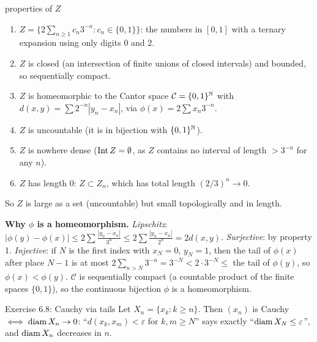 \begin{center}
\end{center}

\begin{thm}{properties of $Z$}
\begin{enumerate}
\item $Z=\{2\sum_{n\ge1}c_n3^{-n}:c_n\in\{0,1\}\}$: the numbers in $[0,1]$ with a ternary
  expansion using only digits $0$ and $2$.
\item $Z$ is closed (an intersection of finite unions of closed intervals) and bounded, so
  sequentially compact.
\item $Z$ is homeomorphic to the Cantor space $\mathcal C=\{0,1\}^\mathbb N$ with
  $d(x,y)=\sum2^{-n}|y_n-x_n|$, via $\phi(x)=2\sum x_n3^{-n}$.
\item $Z$ is uncountable (it is in bijection with $\{0,1\}^\mathbb N$).
\item $Z$ is nowhere dense ($\operatorname{Int} Z=\emptyset$, as $Z$ contains no interval of length
  $>3^{-n}$ for any $n$).
\item $Z$ has length $0$: $Z\subset Z_n$, which has total length $(2/3)^n\to0$.
\end{enumerate}
So $Z$ is large as a set (uncountable) but small topologically and in length.
\end{thm}
\begin{answer}
\textbf{Why $\phi$ is a homeomorphism.} \emph{Lipschitz}: $|\phi(y)-\phi(x)|\le2\sum
\frac{|y_n-x_n|}{3^n}\le2\sum\frac{|y_n-x_n|}{2^n}=2d(x,y)$. \emph{Surjective}: by property 1.
\emph{Injective}: if $N$ is the first index with $x_N=0$, $y_N=1$, then the tail of $\phi(x)$
after place $N-1$ is at most $2\sum_{n>N}3^{-n}=3^{-N}<2\cdot3^{-N}\le$ the tail of $\phi(y)$,
so $\phi(x)<\phi(y)$. $\mathcal C$ is sequentially compact (a countable product of the finite
spaces $\{0,1\}$), so the continuous bijection $\phi$ is a homeomorphism.
\end{answer}

\begin{example}{Exercise 6.8: Cauchy via tails}
Let $X_n=\{x_k:k\ge n\}$. Then $(x_n)$ is Cauchy $\iff\operatorname{diam} X_n\to0$: ``$d(x_k,x_m)<\varepsilon$
for $k,m\ge N$'' says exactly ``$\operatorname{diam} X_N\le\varepsilon$'', and $\operatorname{diam} X_n$ decreases in $n$.
\end{example}

